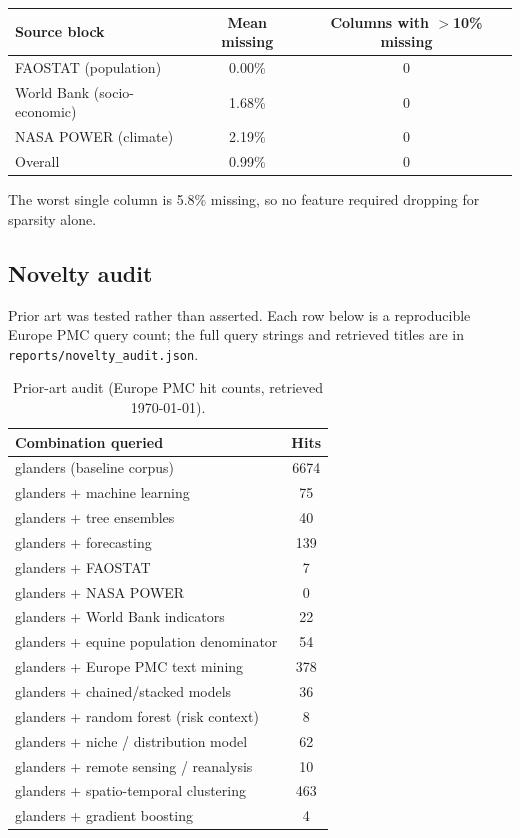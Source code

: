 \documentclass[11pt]{article}
\begin{document}
\begin{center}
\small
\begin{tabular}{@{}lcc@{}}
\toprule
\textbf{Source block} & \textbf{Mean missing} & \textbf{Columns with $>$10\% missing} \\
\midrule
FAOSTAT (population) & 0.00\% & 0 \\
World Bank (socio-economic) & 1.68\% & 0 \\
NASA POWER (climate) & 2.19\% & 0 \\
\midrule
Overall & 0.99\% & 0 \\
\bottomrule
\end{tabular}
\end{center}

\noindent
The worst single column is 5.8\% missing, so no feature required
dropping for sparsity alone.

\subsection{Novelty audit}
\label{sec:novelty}

Prior art was tested rather than asserted. Each row below is a reproducible Europe PMC query
count; the full query strings and retrieved titles are in \texttt{reports/novelty\_audit.json}.

\begin{table}[H]
\centering
\caption{Prior-art audit (Europe PMC hit counts, retrieved \today).}
\label{tab:novelty}
\small
\begin{tabular}{@{}lc@{}}
\toprule
\textbf{Combination queried} & \textbf{Hits} \\
\midrule
glanders (baseline corpus) & 6674 \\
glanders + machine learning & 75 \\
glanders + tree ensembles & 40 \\
glanders + forecasting & 139 \\
glanders + FAOSTAT & 7 \\
glanders + NASA POWER & 0 \\
glanders + World Bank indicators & 22 \\
glanders + equine population denominator & 54 \\
glanders + Europe PMC text mining & 378 \\
glanders + chained/stacked models & 36 \\
glanders + random forest (risk context) & 8 \\
glanders + niche / distribution model & 62 \\
glanders + remote sensing / reanalysis & 10 \\
glanders + spatio-temporal clustering & 463 \\
glanders + gradient boosting & 4 \\
\bottomrule
\end{tabular}
\end{table}
\end{document}
